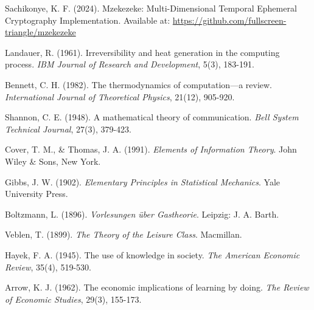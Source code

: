 \documentclass[12pt,a4paper]{article}
\begin{document}

\begin{thebibliography}{99}

 Sachikonye, K. F. (2024). Mzekezeke: Multi-Dimensional Temporal Ephemeral Cryptography Implementation. Available at: \url{https://github.com/fullscreen-triangle/mzekezeke}

 Landauer, R. (1961). Irreversibility and heat generation in the computing process. \textit{IBM Journal of Research and Development}, 5(3), 183-191.

 Bennett, C. H. (1982). The thermodynamics of computation—a review. \textit{International Journal of Theoretical Physics}, 21(12), 905-920.

 Shannon, C. E. (1948). A mathematical theory of communication. \textit{Bell System Technical Journal}, 27(3), 379-423.

 Cover, T. M., \& Thomas, J. A. (1991). \textit{Elements of Information Theory}. John Wiley \& Sons, New York.

 Gibbs, J. W. (1902). \textit{Elementary Principles in Statistical Mechanics}. Yale University Press.

 Boltzmann, L. (1896). \textit{Vorlesungen über Gastheorie}. Leipzig: J. A. Barth.

 Veblen, T. (1899). \textit{The Theory of the Leisure Class}. Macmillan.

 Hayek, F. A. (1945). The use of knowledge in society. \textit{The American Economic Review}, 35(4), 519-530.

 Arrow, K. J. (1962). The economic implications of learning by doing. \textit{The Review of Economic Studies}, 29(3), 155-173.

\end{thebibliography}
\end{document}
